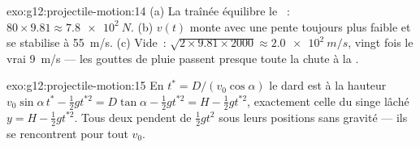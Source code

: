 \begin{solution}{exo:g12:projectile-motion:14}
(a) La traînée équilibre le ~:
$80 \times 9.81 \approx \qty{7.8e2}{N}$.
(b) $v(t)$ monte avec une pente toujours plus faible et se stabilise
à \qty{55}{m/s}. (c) Vide~:
$\sqrt{2 \times 9.81 \times 2000} \approx \qty{2.0e2}{m/s}$, vingt
fois le vrai \qty{9}{m/s} --- les gouttes de pluie passent presque
toute la chute à la .
\end{solution}

\begin{solution}{exo:g12:projectile-motion:15}
En $t^* = D/(v_0\cos\alpha)$ le dard est à la hauteur
$v_0\sin\alpha\, t^* - \tfrac12 g t^{*2} = D\tan\alpha - \tfrac12 g
t^{*2} = H - \tfrac12 g t^{*2}$, exactement celle du singe lâché
$y = H - \tfrac12 g t^{*2}$. Tous deux pendent de $\tfrac12 gt^2$
sous leurs positions sans gravité --- ils se rencontrent pour tout
$v_0$.
\end{solution}

